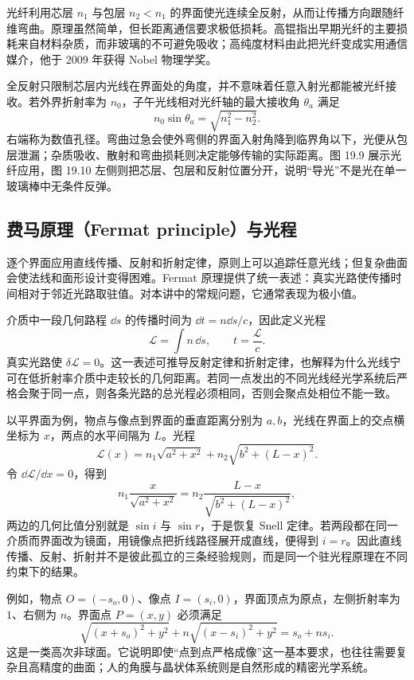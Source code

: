 光纤利用芯层 $n_1$ 与包层 $n_2<n_1$ 的界面使光连续全反射，从而让传播方向跟随纤维弯曲。原理虽然简单，但长距离通信要求极低损耗。高锟指出早期光纤的主要损耗来自材料杂质，而非玻璃的不可避免吸收；高纯度材料由此把光纤变成实用通信媒介，他于 2009 年获得 Nobel 物理学奖。

全反射只限制芯层内光线在界面处的角度，并不意味着任意入射光都能被光纤接收。若外界折射率为 $n_0$，子午光线相对光纤轴的最大接收角 $\theta_a$ 满足
\[
 n_0\sin\theta_a=\sqrt{n_1^2-n_2^2}.
\]
右端称为数值孔径。弯曲过急会使外弯侧的界面入射角降到临界角以下，光便从包层泄漏；杂质吸收、散射和弯曲损耗则决定能够传输的实际距离。图 19.9 展示光纤应用，图 19.10 左侧则把芯层、包层和反射位置分开，说明“导光”不是光在单一玻璃棒中无条件反弹。


\FiberFermatPanel

\subsection*{费马原理（Fermat principle）与光程}

逐个界面应用直线传播、反射和折射定律，原则上可以追踪任意光线；但复杂曲面会使法线和面形设计变得困难。Fermat 原理提供了统一表述：真实光路使传播时间相对于邻近光路取驻值。对本讲中的常规问题，它通常表现为极小值。

介质中一段几何路程 $\dd s$ 的传播时间为 $\dd t=n\dd s/c$，因此定义光程
\begin{equation}
  \mathcal L=\int n\,\dd s,\qquad t=\frac{\mathcal L}{c}.
\end{equation}
真实光路使 $\delta\mathcal L=0$。这一表述可推导反射定律和折射定律，也解释为什么光线宁可在低折射率介质中走较长的几何距离。若同一点发出的不同光线经光学系统后严格会聚于同一点，则各条光路的总光程必须相同，否则会聚点处相位不能一致。

以平界面为例，物点与像点到界面的垂直距离分别为 $a,b$，光线在界面上的交点横坐标为 $x$，两点的水平间隔为 $L$。光程
\[
 \mathcal L(x)=n_1\sqrt{a^2+x^2}
 +n_2\sqrt{b^2+(L-x)^2}.
\]
令 $\dd\mathcal L/\dd x=0$，得到
\[
 n_1\frac{x}{\sqrt{a^2+x^2}}
 =n_2\frac{L-x}{\sqrt{b^2+(L-x)^2}},
\]
两边的几何比值分别就是 $\sin i$ 与 $\sin r$，于是恢复 Snell 定律。若两段都在同一介质而界面改为镜面，用镜像点把折线路径展开成直线，便得到 $i=r$。因此直线传播、反射、折射并不是彼此孤立的三条经验规则，而是同一个驻光程原理在不同约束下的结果。

例如，物点 $O=(-s_o,0)$、像点 $I=(s_i,0)$，界面顶点为原点，左侧折射率为 $1$、右侧为 $n$。界面点 $P=(x,y)$ 必须满足
\begin{equation}
 \sqrt{(x+s_o)^2+y^2}+n\sqrt{(x-s_i)^2+y^2}=s_o+n s_i.
\end{equation}
这是一类高次非球面。它说明即使“点到点严格成像”这一基本要求，也往往需要复杂且高精度的曲面；人的角膜与晶状体系统则是自然形成的精密光学系统。

